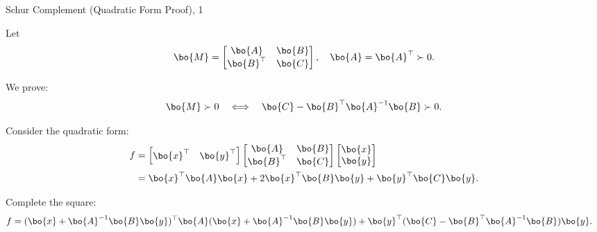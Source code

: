 \documentclass{beamer}
\begin{document}
\begin{frame}{Schur Complement (Quadratic Form Proof), 1}
	\begin{flushleft}
		
		Let 
		\[
		\bo{M} = 
		\begin{bmatrix}
			\bo{A} & \bo{B} \\
			\bo{B}^\top & \bo{C}
		\end{bmatrix},
		\quad \bo{A} = \bo{A}^\top \succ 0.
		\]
		
		We prove:
		\[
		\bo{M} \succ 0 
		\quad \Longleftrightarrow \quad
		\bo{C} - \bo{B}^\top \bo{A}^{-1} \bo{B} \succ 0.
		\]
		
		\bigskip
		
		Consider the quadratic form:
		\begin{align}
			f &= 
			\begin{bmatrix}
				\bo{x}^\top & \bo{y}^\top
			\end{bmatrix}
			\begin{bmatrix}
				\bo{A} & \bo{B} \\
				\bo{B}^\top & \bo{C}
			\end{bmatrix}
			\begin{bmatrix}
				\bo{x} \\ \bo{y}
			\end{bmatrix} \\
			&= \bo{x}^\top \bo{A} \bo{x} + 2 \bo{x}^\top \bo{B} \bo{y} + \bo{y}^\top \bo{C} \bo{y}.
		\end{align}
		
		\bigskip
		
		Complete the square:
		\begin{align*}
			f &= 
			(\bo{x} + \bo{A}^{-1}\bo{B}\bo{y})^\top 
			\bo{A} 
			(\bo{x} + \bo{A}^{-1}\bo{B}\bo{y})
			+ \bo{y}^\top (\bo{C} - \bo{B}^\top \bo{A}^{-1}\bo{B}) \bo{y}.
		\end{align*}
		
	\end{flushleft}
\end{frame}
\end{document}
